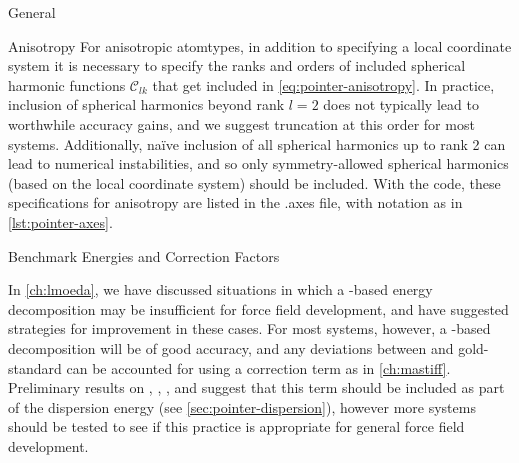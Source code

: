 \begin{subsection}{General}
\begin{paragraph}{Anisotropy}
For anisotropic atomtypes, in addition to specifying a local coordinate system
it is necessary to specify the ranks and orders of included spherical harmonic
functions $\mathcal{C}_{lk}$ that get included in
\cref{eq:pointer-anisotropy}. In practice, inclusion of spherical harmonics
beyond rank $l=2$ does not typically lead to worthwhile accuracy gains, and we
suggest truncation at this order for most systems.  Additionally, na\"ive
inclusion of all spherical harmonics up to rank 2 can lead to numerical
instabilities, and so only symmetry-allowed spherical harmonics (based on the
local coordinate system) should be included.  With the \pointer code, these
specifications for anisotropy are listed in the .axes file, with notation as
in \cref{lst:pointer-axes}. 
\end{paragraph}

\begin{paragraph}{Benchmark Energies and Correction Factors}

In \cref{ch:lmoeda}, we have discussed situations in which a
\sapt-based energy decomposition may be insufficient for force field
development, and have suggested strategies for improvement in these cases. 
For most systems, however, a \sapt-based decomposition will be of good
accuracy, and any deviations between \sapt and gold-standard \ccsdt can be accounted for using a \dccsdt correction
term as in \cref{ch:mastiff}.
Preliminary results on \co, \cl, \ch, and \nh suggest that this \dccsdt term
should be included as part of the dispersion energy (see \cref{sec:pointer-dispersion}), however
more systems should be tested to see if this practice is appropriate for
general force field development.
\end{paragraph}

\end{subsection}
